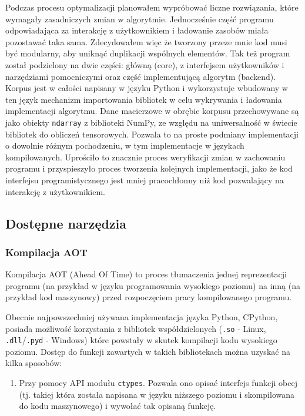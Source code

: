 \documentclass[10pt, a4paper]{article}
\newcommand{\code}[1]{\texttt{#1}}
\begin{document}
\begin{sloppypar}
    Podczas procesu optymalizacji planowałem wypróbować liczne rozwiązania, które wymagały
    zasadniczych zmian w algorytmie. Jednocześnie część programu odpowiadająca za
    interakcję z użytkownikiem i ładowanie zasobów miała pozostawać taka sama. Zdecydowałem
    więc że tworzony przeze mnie kod musi być modularny, aby uniknąć duplikacji
    wspólnych elementów. Tak też program został podzielony na dwie części: główną (core),
    z interfejsem użytkowników i narzędziami pomocniczymi oraz część implementującą algorytm
    (backend). Korpus jest w całości napisany w języku Python i wykorzystuje wbudowany w
    ten język mechanizm importowania bibliotek w celu wykrywania i ładowania
    implementacji algorytmu. Dane macierzowe w obrębie korpusu przechowywane są jako obiekty
    \code{ndarray} z biblioteki NumPy, ze względu na uniwersalność w świecie bibliotek do
    obliczeń tensorowych. Pozwala to na proste podmiany implementacji o dowolnie różnym
    pochodzeniu, w tym implementacje w językach kompilowanych. Uprościło to znacznie
    proces weryfikacji zmian w zachowaniu programu i przyspieszyło proces tworzenia
    kolejnych implementacji, jako że kod interfejsu programistycznego jest mniej pracochłonny
    niż kod pozwalający na interakcję z użytkownikiem.

    \subsection{Dostępne narzędzia}


    \subsubsection{Kompilacja AOT}


    Kompilacja AOT (Ahead Of Time) to proces tłumaczenia jednej reprezentacji programu (na
    przykład w języku programowania wysokiego poziomu) na inną (na przykład kod
    maszynowy) przed rozpoczęciem pracy kompilowanego programu.

    Obecnie najpowszechniej używana implementacja języka Python, CPython, posiada możliwość
    korzystania z bibliotek współdzielonych (\code{.so} - Linux, \code{.dll}/\code{.pyd}
    - Windows) które powstały w skutek kompilacji kodu wysokiego poziomu. Dostęp do
    funkcji zawartych w takich bibliotekach można uzyskać na kilka sposobów:

    \begin{enumerate}
      \item Przy pomocy API modułu \code{ctypes}\cite{Python_ctypes}. Pozwala ono opisać
        interfejs funkcji obcej (tj. takiej która została napisana w języku niższego
        poziomu i skompilowana do kodu maszynowego) i wywołać tak opisaną funkcję.


\end{enumerate}
\end{sloppypar}
\end{document}
